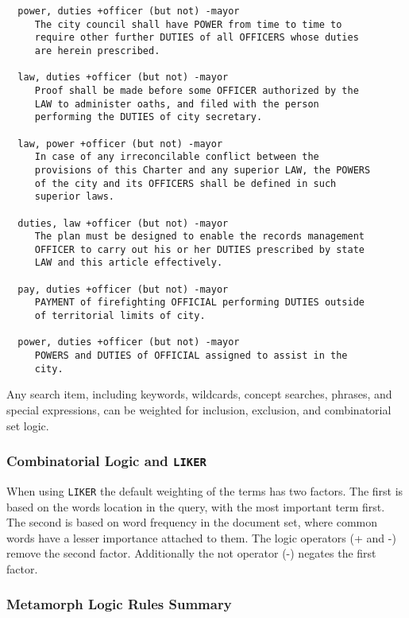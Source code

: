\begin{verbatim}
  power, duties +officer (but not) -mayor
     The city council shall have POWER from time to time to
     require other further DUTIES of all OFFICERS whose duties
     are herein prescribed.

  law, duties +officer (but not) -mayor
     Proof shall be made before some OFFICER authorized by the
     LAW to administer oaths, and filed with the person
     performing the DUTIES of city secretary.

  law, power +officer (but not) -mayor
     In case of any irreconcilable conflict between the
     provisions of this Charter and any superior LAW, the POWERS
     of the city and its OFFICERS shall be defined in such
     superior laws.

  duties, law +officer (but not) -mayor
     The plan must be designed to enable the records management
     OFFICER to carry out his or her DUTIES prescribed by state
     LAW and this article effectively.

  pay, duties +officer (but not) -mayor
     PAYMENT of firefighting OFFICIAL performing DUTIES outside
     of territorial limits of city.

  power, duties +officer (but not) -mayor
     POWERS and DUTIES of OFFICIAL assigned to assist in the
     city.
\end{verbatim}

Any search item, including keywords, wildcards, concept searches,
phrases, and special expressions, can be weighted for inclusion,
exclusion, and combinatorial set logic.

\subsubsection{Combinatorial Logic and {\tt LIKER}}

When using \verb`LIKER` the default weighting of the terms has two factors.
The first is based on the words location in the query, with the most
important term first.  The second is based on word frequency in the
document set, where common words have a lesser importance attached
to them.  The logic operators (+ and -) remove the second factor.
Additionally the not operator (-) negates the first factor.

\subsubsection{Metamorph Logic Rules Summary}

